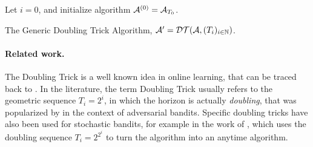 \documentclass[12pt]{colt2018} %
\begin{document}
\vspace*{5pt}  %
\begin{framed}
\begin{algorithm}[H]
        \LinesNumbered  %
        \DontPrintSemicolon
        \BlankLine
        Let $i = 0$, and initialize algorithm $\mathcal{A}^{(0)} = \mathcal{A}_{T_0}$.\;
        \caption{The Generic Doubling Trick Algorithm, $\mathcal{A}' = \mathcal{DT}(\mathcal{A}, (T_i)_{i\in\mathbb{N}})$.}
\label{algo:DTr}
\end{algorithm}
\end{framed}
\vspace*{5pt}  %

%


\paragraph{Related work.}
The Doubling Trick is a well known idea in online learning, that can be traced back to \cite{auer1995gambling}.
In the literature, the term Doubling Trick usually refers to the geometric sequence $T_i = 2^i$, in which the horizon is actually \emph{doubling}, that was popularized by
\cite{CesaLugosi06} in the context of adversarial bandits. Specific doubling tricks have also been used for stochastic bandits, for example in the work of \cite{Auer10}, which uses
the doubling sequence $T_i = 2^{2^{i}}$ to turn the \UCBR{} algorithm into an anytime algorithm.
\end{document}

